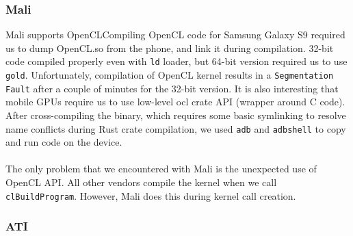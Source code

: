 \subsubsection{Mali}
Mali supports OpenCLCompiling OpenCL code for Samsung Galaxy S9 required us to dump OpenCL.so from the phone, and link it during compilation. 32-bit code compiled properly even with \texttt{ld} loader, but 64-bit version required us to use \texttt{gold}. Unfortunately, compilation of OpenCL kernel results in a \texttt{Segmentation Fault} after a couple of minutes for the 32-bit version. It is also interesting that mobile GPUs require us to use low-level ocl crate API (wrapper around C code). After cross-compiling the binary, which requires some basic symlinking to resolve name conflicts during Rust crate compilation, we used \texttt{adb} and \texttt{adbshell} to copy and run code on the device.\\
\\
The only problem that we encountered with Mali is the unexpected use of OpenCL API. All other vendors compile the kernel when we call \texttt{clBuildProgram}. However, Mali does this during kernel call creation.

\subsubsection{ATI}


